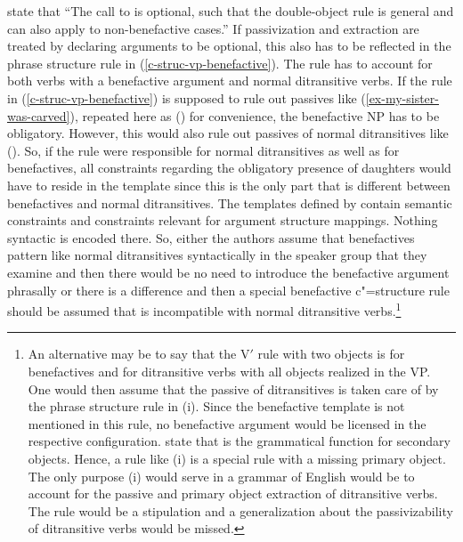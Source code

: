 \citet[]{AGT2014a} state that ``The call to  is optional, such
that the double-object rule is general and can also apply to non-benefactive cases.'' If
passivization and extraction are treated by declaring arguments to be optional, this also has to be
reflected in the phrase structure rule in (\ref{c-struc-vp-benefactive}). The rule has to account
for both verbs with a benefactive argument and normal ditransitive verbs.
If the rule in (\ref{c-struc-vp-benefactive}) is supposed to rule out passives like
(\ref{ex-my-sister-was-carved}), repeated here as () for convenience, the benefactive NP has to be obligatory. 
\z
However, this would also rule out passives of normal ditransitives like ().
\z
\largerpage[2]
So, if the rule were responsible for normal ditransitives as well as for benefactives, all
constraints regarding the obligatory presence of daughters would have to reside in the template
since this is the only part that is different between benefactives and normal ditransitives. The
templates defined by \citet{AGT2014a} contain semantic constraints and constraints relevant for
argument structure mappings. Nothing syntactic is encoded there. So, either the authors assume that
benefactives pattern like normal ditransitives syntactically in the speaker group that they
examine and then there would be no need to introduce the benefactive argument phrasally or there is
a difference and then a special benefactive c"=structure rule should be assumed that is incompatible
with normal ditransitive verbs.\footnote{%
 An alternative may be to say that the V$'$ rule with two objects is for benefactives and for
 ditransitive verbs with all objects realized in the VP. One would then assume that the passive of
 ditransitives is taken care of by the phrase structure rule in (i).
\ea\label{c-struc-vp-ditransitive-passive}
\z
Since the benefactive template is not mentioned in this rule, no benefactive argument would be
licensed in the respective configuration. \citet*{BATW2015a} state that \objtheta is the grammatical
function for secondary objects. Hence, a rule like (i) is a special rule with a missing primary
object. The only purpose (i) would serve in a grammar of English would be to account for the passive
and primary object extraction of ditransitive verbs. The rule would be a stipulation and a
generalization about the passivizability of ditransitive verbs would be missed.
}




